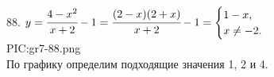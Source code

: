 88. $y=\cfrac{4-x^2}{x+2}-1=\cfrac{(2-x)(2+x)}{x+2}-1=\begin{cases} 1-x,\\ x\neq-2.\end{cases}$\\
{{PIC:gr7-88.png}}\\
По графику определим подходящие значения 1, 2 и 4.\\
